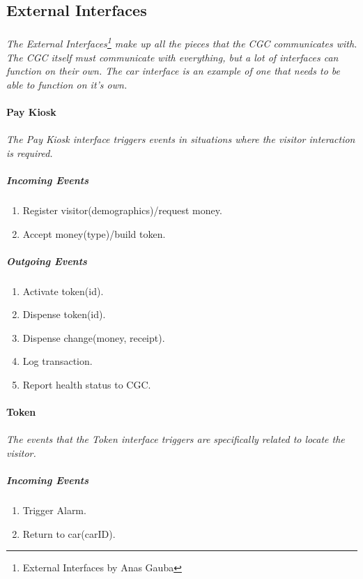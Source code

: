 \documentclass[12pt]{article}
\begin{document}
	\subsection{External Interfaces} \label{inter}%
	\paragraph{} \textit{The External Interfaces\footnote{External Interfaces by Anas Gauba} 
	make up all the pieces that the CGC communicates with. The CGC itself must 
	communicate with everything, 	but a lot of interfaces can function on their own. The 
	car interface is an example of one that needs to be able to function on it's own.}
		
	\paragraph{Pay Kiosk}
	\paragraph {}\textit{The Pay Kiosk interface triggers events in situations where the visitor interaction is required.  }
	    \subparagraph{Incoming Events}
		\begin{enumerate}
		    \item Register visitor(demographics)/request money.
		    \item Accept money(type)/build token.
		\end{enumerate}
				
	    \subparagraph{Outgoing Events}
		\begin{enumerate}
            \item Activate token(id).
            \item Dispense token(id). 
            \item Dispense change(money, receipt).
            \item Log transaction. 
            \item Report health status to CGC. 
		\end{enumerate}

	\paragraph{Token}
	\paragraph {}\textit{The events that the Token interface triggers are specifically related to locate the visitor.  }
	    \subparagraph{Incoming Events}
		\begin{enumerate}
            \item Trigger Alarm. 
            \item Return to car(carID). 
		\end{enumerate}
				
\end{document}
